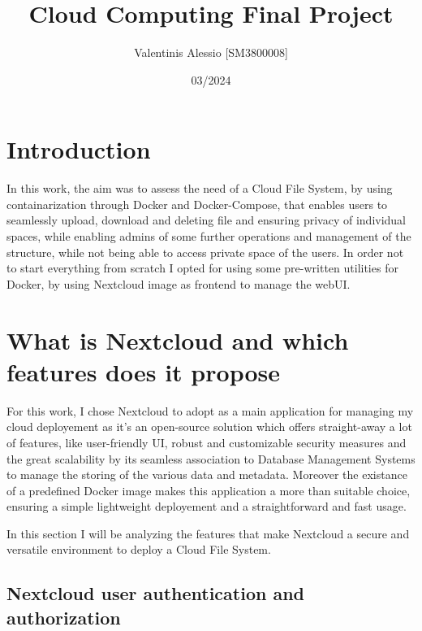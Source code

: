 \documentclass{article}
\title{Cloud Computing Final Project}
\author{Valentinis Alessio [SM3800008]}
\date{03/2024}
\begin{document}
	\maketitle
	\tableofcontents
	
	\section{Introduction}
	In this work, the aim was to assess the need of a Cloud File System, by using containarization through Docker and Docker-Compose, that enables users to seamlessly upload, download and deleting file and ensuring privacy of individual spaces, while enabling admins of some further operations and management of the structure, while not being able to access private space of the users. In order not to start everything from scratch I opted for using some pre-written utilities for Docker, by using Nextcloud image as frontend to manage the webUI.
	
	\section{What is Nextcloud and which features does it propose}
	For this work, I chose Nextcloud to adopt as a main application for managing my cloud deployement as it's an open-source solution which offers straight-away a lot of features, like user-friendly UI, robust and customizable security measures and the great scalability by its seamless association to Database Management Systems to manage the storing of the various data and metadata. Moreover the existance of a predefined Docker image makes this application a more than suitable choice, ensuring a simple lightweight deployement and a straightforward and fast usage.
	
	In this section I will be analyzing the features that make Nextcloud a secure and versatile environment to deploy a Cloud File System.
	
	\subsection{Nextcloud user authentication and authorization}
	
\end{document}
